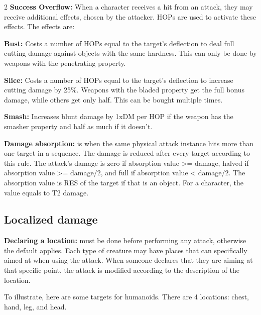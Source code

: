 \begin{multicols}{2}
\textbf{Success Overflow:} When a character receives a hit from an attack, they may receive additional effects, chosen by the attacker. HOPs are used to activate these effects. The effects are:

\begin{proplist}
    \item \textbf{Bust:} Costs a number of HOPs equal to the target's deflection to deal full cutting damage against objects with the same hardness. This can only be done by weapons with the penetrating property.
    \item \textbf{Slice:} Costs a number of HOPs equal to the target's deflection to increase cutting damage by 25\%. Weapons with the bladed property get the full bonus damage, while others get only half. This can be bought multiple times.
    \item \textbf{Smash:} Increases blunt damage by 1xDM per HOP if the weapon has the smasher property and half as much if it doesn't.
\end{proplist}

\textbf{Damage absorption:} is when the same physical attack instance hits more than one target in a sequence. The damage is reduced after every target according to this rule. The attack's damage is zero if absorption value >= damage, halved if absorption value >= damage/2, and full if absorption value < damage/2. The absorption value is RES of the target if that is an object. For a character, the value equals to T2 damage.


\subsection{Localized damage}


\textbf{Declaring a location:} must be done before performing any attack, otherwise the default applies. Each type of creature may have places that can specifically aimed at when using the attack. When someone declares that they are aiming at that specific point, the attack is modified according to the description of the location. 

To illustrate, here are some targets for humanoids. There are 4 locations: chest, hand, leg, and head.


\end{multicols}
